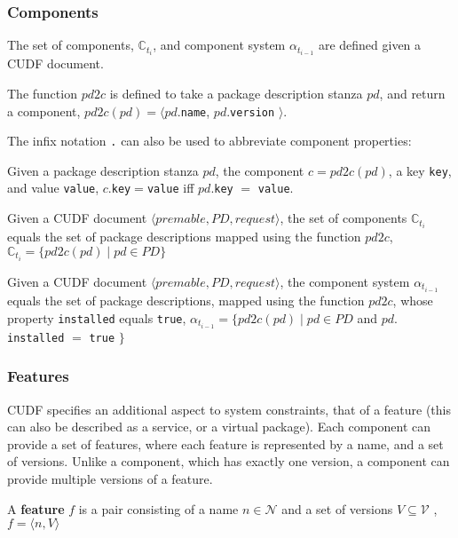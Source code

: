 \subsubsection{Components}
The set of components, $\mathbb{C}_{t_i}$, and component system $\alpha_{t_{i-1}}$ are defined given a CUDF document.

\begin{defs}
The function $pd2c$ is defined to take a package description stanza $pd$, and return a component, $pd2c(pd) = \langle pd.$\texttt{name}, $pd.$\texttt{version} $\rangle$.
\end{defs}

The infix notation \texttt{.} can also be used to abbreviate component properties: 
\begin{defs}
Given a package description stanza $pd$,  the component $c = pd2c(pd)$, a key \texttt{key}, and value \texttt{value}, 
$c$.\texttt{key}$ = $\texttt{value} iff $pd$.\texttt{key} $ = $ \texttt{value}.
\end{defs}

\begin{defs}
Given a CUDF document $\langle premable, PD, request \rangle$, the set of components $\mathbb{C}_{t_i}$ equals the set of package descriptions mapped using the function $pd2c$,
$\mathbb{C}_{t_i} = \{pd2c(pd) \mid pd \in PD\}$
\end{defs}

\begin{defs}
Given a CUDF document $\langle premable, PD, request \rangle$, the component system $\alpha_{t_{i-1}}$ equals the set of package descriptions, mapped using the function $pd2c$,
whose property \texttt{installed} equals \texttt{true},
$\alpha_{t_{i-1}} = \{pd2c(pd) \mid pd \in PD $ and $ pd.$\texttt{installed} $=$ \texttt{true} $\}$
\end{defs}

\subsubsection{Features}
CUDF specifies an additional aspect to system constraints, that of a feature (this can also be described as a service, or a virtual package).
Each component can provide a set of features, where each feature is represented by a name, and a set of versions.
Unlike a component, which has exactly one version, a component can provide multiple versions of a feature.

\begin{defs}
A \textbf{feature} $f$ is a pair consisting of a name $n \in \mathcal{N}$ and a set of versions $V \subseteq \mathcal{V}$ , 
$f = \langle n,V \rangle$
\end{defs}

